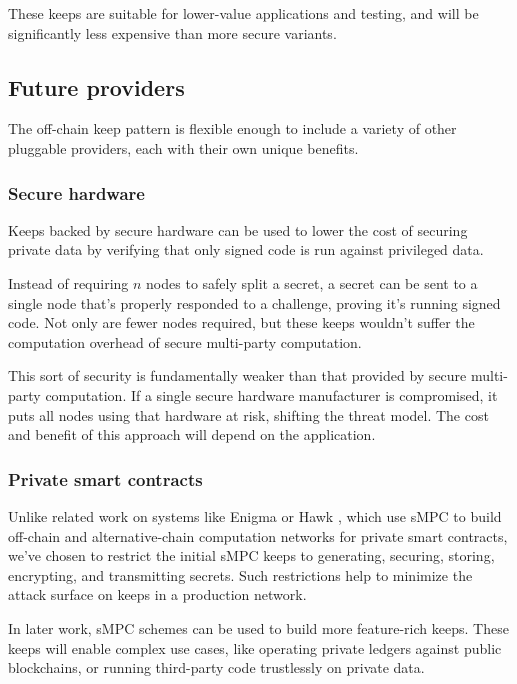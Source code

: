 \documentclass[11pt]{article}
\begin{document}
These keeps are suitable for lower-value applications and testing, and
will be significantly less expensive than more secure variants.

\subsection{Future providers}

The off-chain keep pattern is flexible enough to include a variety of
other pluggable providers, each with their own unique benefits.

\subsubsection{Secure hardware}

Keeps backed by secure hardware can be used to lower the cost of
securing private data by verifying that only signed code is run
against privileged data.

Instead of requiring $n$ nodes to safely split a secret, a secret can
be sent to a single node that's properly responded to a challenge,
proving it's running signed code. Not only are fewer nodes required,
but these keeps wouldn't suffer the computation overhead of secure
multi-party computation.

This sort of security is fundamentally weaker than that provided by
secure multi-party computation. If a single secure hardware
manufacturer is compromised, it puts all nodes using that hardware at
risk, shifting the threat model. The cost and benefit of this approach
will depend on the application.

\subsubsection{Private smart contracts}

Unlike related work on systems like Enigma \cite{enigma} or Hawk
\cite{hawk}, which use sMPC to build off-chain and alternative-chain
computation networks for private smart contracts, we've chosen to
restrict the initial sMPC keeps to generating, securing, storing,
encrypting, and transmitting secrets. Such restrictions help to
minimize the attack surface on keeps in a production network.

In later work, sMPC schemes can be used to build more feature-rich
keeps. These keeps will enable complex use cases, like operating
private ledgers against public blockchains, or running third-party
code trustlessly on private data.
\end{document}
